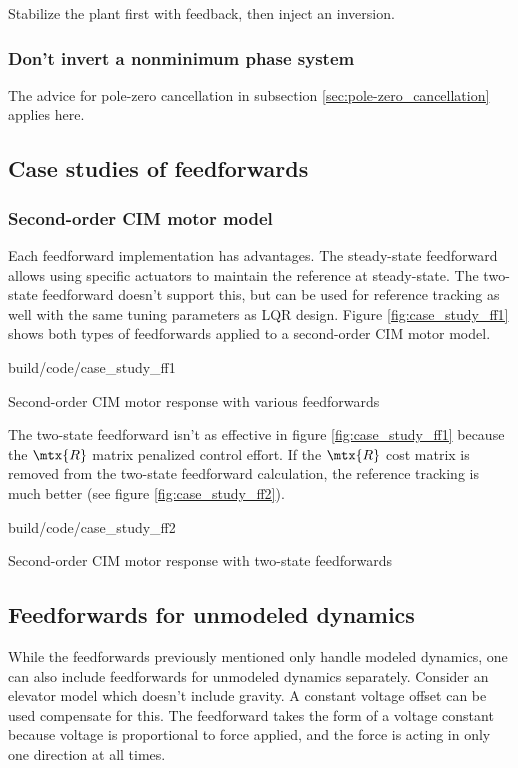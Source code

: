 Stabilize the plant first with feedback, then inject an inversion.

\subsubsection{Don't invert a nonminimum phase system}

The advice for pole-zero cancellation in subsection
\ref{sec:pole-zero_cancellation} applies here.

\subsection{Case studies of feedforwards}

\subsubsection{Second-order CIM motor model}

Each feedforward implementation has advantages. The steady-state feedforward
allows using specific actuators to maintain the \gls{reference} at steady-state.
The two-state feedforward doesn't support this, but can be used for
\gls{reference} \gls{tracking} as well with the same tuning parameters as LQR
design. Figure \ref{fig:case_study_ff1} shows both types of feedforwards applied
to a second-order CIM motor model.

\begin{svg}{build/code/case_study_ff1}
  \caption{Second-order CIM motor response with various feedforwards}
  \label{fig:case_study_ff1}
\end{svg}

The two-state feedforward isn't as effective in figure \ref{fig:case_study_ff1}
because the $\mtx{R}$ matrix penalized \gls{control effort}. If the $\mtx{R}$
cost matrix is removed from the two-state feedforward calculation, the
\gls{reference} \gls{tracking} is much better (see figure
\ref{fig:case_study_ff2}).

\begin{svg}{build/code/case_study_ff2}
  \caption{Second-order CIM motor response with two-state feedforwards}
  \label{fig:case_study_ff2}
\end{svg}

\subsection{Feedforwards for unmodeled dynamics}

While the feedforwards previously mentioned only handle modeled dynamics, one
can also include feedforwards for unmodeled dynamics separately. Consider an
elevator model which doesn't include gravity. A constant voltage offset can be
used compensate for this. The feedforward takes the form of a voltage constant
because voltage is proportional to force applied, and the force is acting in
only one direction at all times.

